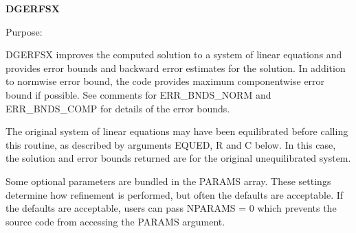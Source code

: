 {\bfseries D\+G\+E\+R\+F\+S\+X} 

 \begin{DoxyParagraph}{Purpose\+: }
\begin{DoxyVerb}    DGERFSX improves the computed solution to a system of linear
    equations and provides error bounds and backward error estimates
    for the solution.  In addition to normwise error bound, the code
    provides maximum componentwise error bound if possible.  See
    comments for ERR_BNDS_NORM and ERR_BNDS_COMP for details of the
    error bounds.

    The original system of linear equations may have been equilibrated
    before calling this routine, as described by arguments EQUED, R
    and C below. In this case, the solution and error bounds returned
    are for the original unequilibrated system.\end{DoxyVerb}
 \begin{DoxyVerb}     Some optional parameters are bundled in the PARAMS array.  These
     settings determine how refinement is performed, but often the
     defaults are acceptable.  If the defaults are acceptable, users
     can pass NPARAMS = 0 which prevents the source code from accessing
     the PARAMS argument.\end{DoxyVerb}

\end{DoxyParagraph}

